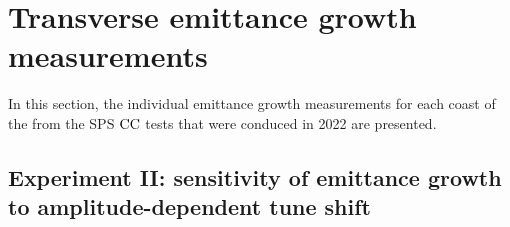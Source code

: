 \newpage
 \section{Transverse emittance growth measurements}\label{sec:emittance_growth_2022}

In this section, the individual emittance growth measurements for each coast of the from the SPS ${\mathrm{CC}}$ tests that were conduced in 2022 are presented.


 \subsection{Experiment II: sensitivity of emittance growth to amplitude-dependent tune shift}\label{subsec:emittance_growth_2022_exper2}


